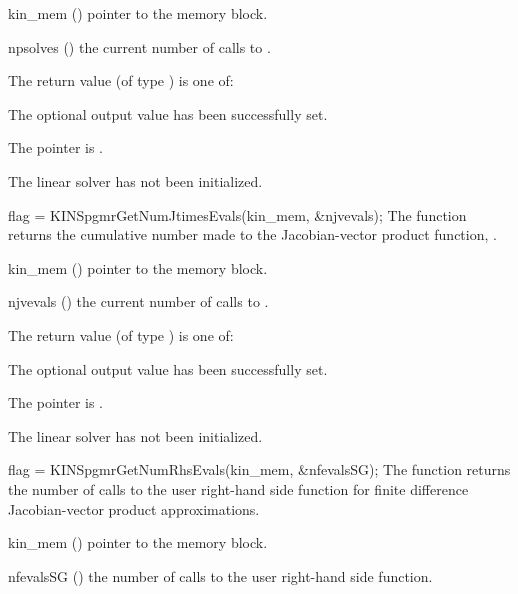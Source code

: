 {
  \begin{args}
  \item[kin\_mem] ()
    pointer to the {\kinsol} memory block.
  \item[npsolves] ()
    the current number of calls to .
  \end{args}
}
{
  The return value  (of type ) is one of:
  \begin{args}
  \item[\Id{KINSPGMR\_SUCCESS}] 
    The optional output value has been successfully set.
  \item[\Id{KINSPGMR\_MEM\_NULL}]
    The  pointer is .
  \item[\Id{KINSPGMR\_LMEM\_NULL}]
    The {\kinspgmr} linear solver has not been initialized.
  \end{args}
}
{}
{
  flag = KINSpgmrGetNumJtimesEvals(kin\_mem, \&njvevals);
}
{
  The function  returns the
  cumulative number made to the Jacobian-vector product function,
  .
}
{
  \begin{args}
  \item[kin\_mem] ()
    pointer to the {\kinsol} memory block.
  \item[njvevals] ()
    the current number of calls to .
  \end{args}
}
{
  The return value  (of type ) is one of:
  \begin{args}
  \item[\Id{KINSPGMR\_SUCCESS}] 
    The optional output value has been successfully set.
  \item[\Id{KINSPGMR\_MEM\_NULL}]
    The  pointer is .
  \item[\Id{KINSPGMR\_LMEM\_NULL}]
    The {\kinspgmr} linear solver has not been initialized.
  \end{args}
}
{}
{
  flag = KINSpgmrGetNumRhsEvals(kin\_mem, \&nfevalsSG);
}
{
  The function  returns the
  number of calls to the user right-hand side function for
  finite difference Jacobian-vector product approximations.
}
{
  \begin{args}
  \item[kin\_mem] ()
    pointer to the {\kinsol} memory block.
  \item[nfevalsSG] ()
    the number of calls to the user right-hand side function.
  \end{args}
}

